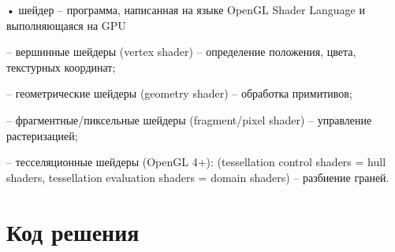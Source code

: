 \documentclass[a4paper, 14pt]{extarticle}
\begin{document}
• шейдер – программа, написанная на языке OpenGL Shader Language и выполняющаяся на GPU

– вершинные шейдеры (vertex shader) – определение положения, цвета, текстурных координат;

– геометрические шейдеры (geometry shader) – обработка примитивов;

– фрагментные/пиксельные шейдеры (fragment/pixel shader) – управление растеризацией;

– тесселяционные шейдеры (OpenGL 4+): (tessellation control shaders = hull shaders, tessellation evaluation shaders = domain shaders) – разбиение граней.

\pagebreak
\section{Код решения}
\end{document}
